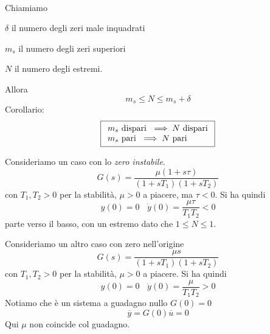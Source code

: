 \begin{thm}
	\\
	Chiamiamo
	
	$\delta $ il numero degli zeri male inquadrati
	
	$m_s$ il numero degli zeri superiori
	
	$N$ il numero degli estremi.
	
	Allora
	\begin{equation*}
		\boxed{m_s \leq N\leq m_s +\delta }
	\end{equation*}
	Corollario:
	\begin{equation*}
		\boxed{
			\begin{array}{{>{\displaystyle}l}}
				m_s \ \text{dispari} \ \implies N\ \text{dispari} \\
				m_s \ \text{pari} \ \implies N\ \text{pari}       
			\end{array}
		}
	\end{equation*}
\end{thm}

Consideriamo un caso con lo \textit{zero instabile}.
\begin{equation*}
	G(s)=\frac{\mu (1+s\tau)}{(1+sT_1)(1+sT_2)}
\end{equation*}
con $T_1 ,T_2  >0$ per la stabilità, $\mu  >0$ a piacere, ma $\tau < 0$. Si ha quindi
\begin{equation*}
	y(0) =0\ \ \ \ \dot{y}(0) =\frac{\mu \tau }{T_1 T_2} < 0
\end{equation*}
parte verso il basso, con un estremo dato che $1\leq N\leq 1$.

Consideriamo un altro caso con zero nell'origine
\begin{equation*}
	G(s)=\frac{\mu s}{(1+sT_1)(1+sT_2)}
\end{equation*}
con $T_1 ,T_2  >0$ per la stabilità, $\mu  >0$ a piacere. Si ha quindi
\begin{equation*}
	y(0) =0\ \ \ \ \dot{y}(0) =\frac{\mu }{T_1 T_2}  >0
\end{equation*}
Notiamo che è un sistema a guadagno nullo $G(0) =0$
\begin{equation*}
	\overline{y} =G(0)\overline{u} =0
\end{equation*}
Qui $\mu $ non coincide col guadagno.

